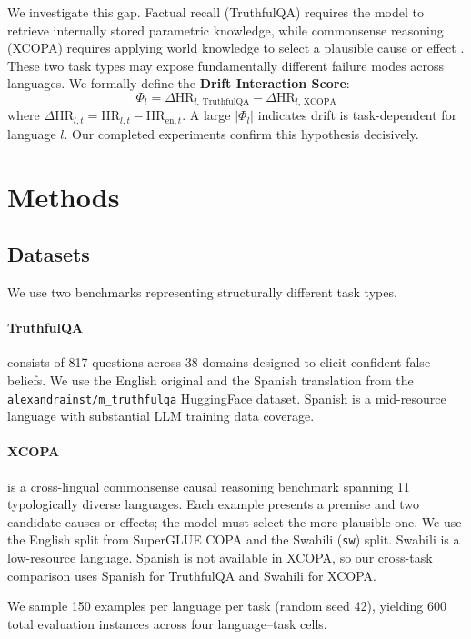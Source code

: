\documentclass[11pt]{article}
\begin{document}
We investigate this gap. Factual recall (TruthfulQA) requires the model to retrieve
internally stored parametric knowledge, while commonsense reasoning (XCOPA) requires
applying world knowledge to select a plausible cause or effect \cite{qi-etal-2023-cross}.
These two task types may expose fundamentally different failure modes across languages.
We formally define the \textbf{Drift Interaction Score}:
\[
\Phi_l = \Delta\mathrm{HR}_{l,\,\text{TruthfulQA}} - \Delta\mathrm{HR}_{l,\,\text{XCOPA}}
\]
where $\Delta\mathrm{HR}_{l,t} = \mathrm{HR}_{l,t} - \mathrm{HR}_{\text{en},t}$.
A large $|\Phi_l|$ indicates drift is task-dependent for language $l$. Our
completed experiments confirm this hypothesis decisively.

\section{Methods}

\subsection{Datasets}

We use two benchmarks representing structurally different task types.

\paragraph{TruthfulQA} \cite{lin-etal-2022-truthfulqa} consists of 817 questions
across 38 domains designed to elicit confident false beliefs. We use the English
original and the Spanish translation from the \texttt{alexandrainst/m\_truthfulqa}
HuggingFace dataset. Spanish is a mid-resource language with substantial LLM
training data coverage.

\paragraph{XCOPA} is a cross-lingual commonsense causal reasoning benchmark
spanning 11 typologically diverse languages. Each example presents a premise and
two candidate causes or effects; the model must select the more plausible one. We
use the English split from SuperGLUE COPA and the Swahili (\texttt{sw}) split.
Swahili is a low-resource language. Spanish is not available in XCOPA, so our
cross-task comparison uses Spanish for TruthfulQA and Swahili for XCOPA.

We sample 150 examples per language per task (random seed 42), yielding 600 total
evaluation instances across four language--task cells.
\end{document}
